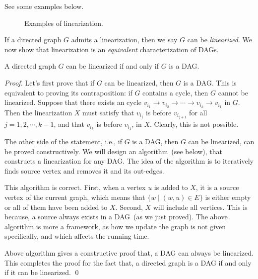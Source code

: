 See some examples below.

\begin{figure}[h!]
\centering{}
\caption{Examples of linearization.}
\end{figure}

If a directed graph $G$ admits a linearization, then we say $G$ can be \emph{linearized}.
We now show that linearization is an \emph{equivalent} characterization of DAGs.

\begin{claim}
A directed graph $G$ can be linearized if and only if $G$ is a DAG.
\label{claim:dag}
\end{claim}

\emph{Proof.}  Let's first prove that if $G$ can be linearized, then $G$ is a DAG.
This is equivalent to proving its contraposition: if $G$ contains a cycle, then $G$ cannot be linearized.
Suppose that there exists an cycle $v_{i_1} \to v_{i_2} \to \cdots \to v_{i_k} \to v_{i_1}$ in $G$.
Then the linearization $X$ must satisfy that $v_{i_{j}}$ is before $v_{i_{j+1}}$ for all $j = 1, 2, \cdots, k-1$,
and that $v_{i_{k}}$ is before $v_{i_1}$, in $X$. Clearly, this is not possible.

The other side of the statement, i.e., if $G$ is a DAG, then $G$ can be linearized, can be proved constructively.
We will design an algorithm~(see below), that constructs a linearization for any DAG. 
The idea of the algorithm is to iteratively
finds source vertex and removes it and its out-edges.

\begin{algorithmblock}[0.8\textwidth]
	\xxx
	\xxx
	\xxx
	\xxx
	\xxx
	\xxx
\end{algorithmblock}

This algorithm is correct. First, when a vertex $u$ is added to $X$,
it is a source vertex of the current graph, which means that
$\{w\mid (w, u)\in E\}$ is either empty or all of them
have been added to $X$. Second, $X$ will include all vertices.
This is because, a source always exists in a DAG~(as we just proved).
The above algorithm is more a framework, as how we update the graph
is not given specifically, and which affects the running time.

Above algorithm gives a constructive proof that, a DAG can always
be linearized. This completes the proof for the fact that, a directed graph is a DAG if and only if it can be linearized.
\qed

